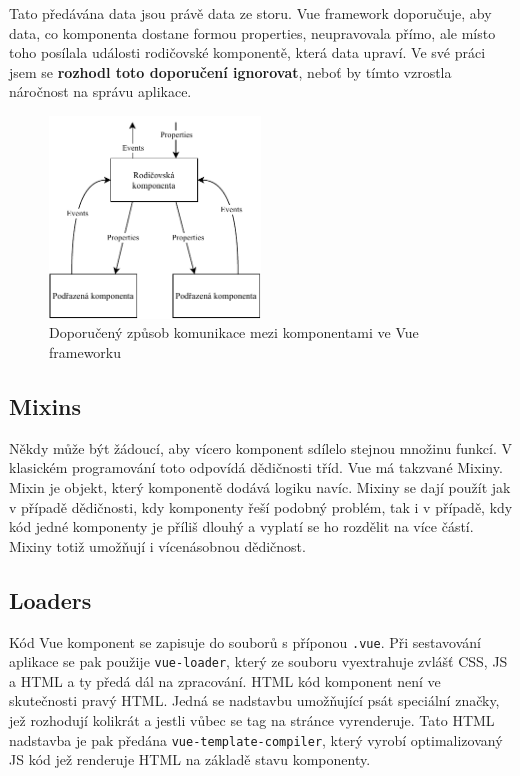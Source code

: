 Tato předávána data jsou právě data ze storu. Vue framework doporučuje, aby data, co komponenta dostane formou properties, neupravovala přímo, ale místo toho posílala události rodičovské komponentě, která data upraví. Ve své práci jsem se \textbf{rozhodl toto doporučení ignorovat}, neboť by tímto vzrostla náročnost na správu aplikace.

\begin{figure}[h]
    \centering
    \includegraphics[width=0.5\textwidth]{media/vue.pdf}
    \caption{Doporučený způsob komunikace mezi komponentami ve Vue frameworku}
\end{figure}

\subsection{Mixins}
Někdy může být žádoucí, aby vícero komponent sdílelo stejnou množinu funkcí. V klasickém programování toto odpovídá dědičnosti tříd. Vue má takzvané Mixiny. Mixin je objekt, který komponentě dodává logiku navíc. Mixiny se dají použít jak v případě dědičnosti, kdy komponenty řeší podobný problém, tak i v případě, kdy kód jedné komponenty je příliš dlouhý a vyplatí se ho rozdělit na více částí. Mixiny totiž umožňují i vícenásobnou dědičnost.

\subsection{Loaders}
Kód Vue komponent se zapisuje do souborů s příponou \texttt{.vue}. Při sestavování aplikace se pak použije \texttt{vue-loader}, který ze souboru vyextrahuje zvlášť CSS, JS a HTML a ty předá dál na zpracování. HTML kód komponent není ve skutečnosti pravý HTML. Jedná se nadstavbu umožňující psát speciální značky, jež rozhodují kolikrát a jestli vůbec se tag na stránce vyrenderuje. Tato HTML nadstavba je pak předána \texttt{vue-template-compiler}, který vyrobí optimalizovaný JS kód jež renderuje HTML na základě stavu komponenty.

